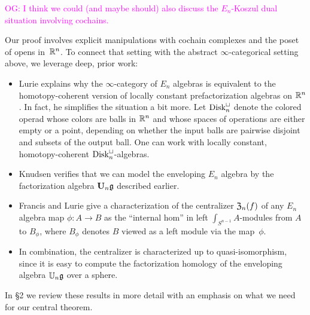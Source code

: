 \documentclass[11pt]{amsart}
\numberwithin{equation}{section}
\def\owen{\textcolor{magenta}{OG: }\textcolor{magenta}}
\begin{document}
\owen{I think we could (and maybe should) also discuss the $E_n$-Koszul dual situation involving cochains.}

\def\Disk{{\rm Disk}}

Our proof involves explicit manipulations with cochain complexes and the poset of opens in~$\mathbb R^n$.
To connect that setting with the abstract $\infty$-categorical setting above,
we leverage deep, prior work:
\begin{itemize}
\item Lurie \cite{LurieHA} explains why the $\infty$-category of $E_n$ algebras is equivalent to the homotopy-coherent version of locally constant prefactorization algebras on $\mathbb R^n$.  
In fact, he simplifies the situation a bit more. 
Let $\Disk_n^\sqcup$ denote the colored operad whose colors are balls in $\mathbb R^n$ and whose spaces of operations are either empty or a point, depending on whether the input balls are pairwise disjoint and subsets of the output ball. 
One can work with locally constant, homotopy-coherent $\Disk_n^\sqcup$-algebras.
\item Knudsen verifies that we can model the enveloping $E_n$ algebra by the factorization algebra $\mathbf U_n \mathfrak g$ described earlier.
\item Francis and Lurie give a characterization of the centralizer ${\frak Z}_n(f)$ of any $E_n$ algebra map $\phi: A \to B$ as the ``internal hom'' in left $\int_{S^{n-1}}A$-modules from $A$ to $B_\phi$, where $B_\phi$ denotes $B$ viewed as a left module via the map~$\phi$.
\item In combination, the centralizer is characterized up to quasi-isomorphism, 
since it is easy to compute the factorization homology of the enveloping algebra $\mathbb U_n \mathfrak g$ over a sphere.
\end{itemize}
In \S2 we review these results in more detail with an emphasis on what we need for our central theorem.
\end{document}
